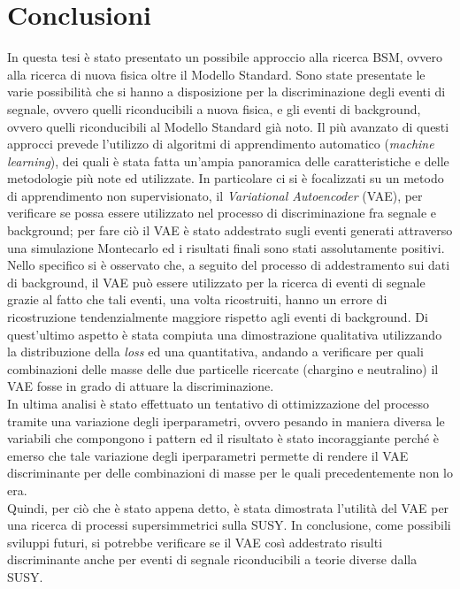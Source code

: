 
\section{Conclusioni}
\label{sec:conclusioni}

In questa tesi è stato presentato un possibile approccio alla ricerca BSM, ovvero alla ricerca di nuova fisica oltre il Modello Standard. Sono state presentate le varie possibilità che si hanno a disposizione per la discriminazione degli eventi di segnale, ovvero quelli riconducibili a nuova fisica, e gli eventi di background, ovvero quelli riconducibili al Modello Standard già noto. Il più avanzato di questi approcci prevede l'utilizzo di algoritmi di apprendimento automatico (\textit{machine learning}), dei quali è stata fatta un'ampia panoramica delle caratteristiche e delle metodologie più note ed utilizzate. In particolare ci si è focalizzati su un metodo di apprendimento non supervisionato, il \textit{Variational Autoencoder} (VAE), per verificare se possa essere utilizzato nel processo di discriminazione fra segnale e background; per fare ciò il VAE è stato addestrato sugli eventi generati attraverso una simulazione Montecarlo ed i risultati finali sono stati assolutamente positivi. Nello specifico si è osservato che, a seguito del processo di addestramento sui dati di background, il VAE può essere utilizzato per la ricerca di eventi di segnale grazie al fatto che tali eventi, una volta ricostruiti, hanno un errore di ricostruzione tendenzialmente maggiore rispetto agli eventi di background. Di quest'ultimo aspetto è stata compiuta una dimostrazione qualitativa utilizzando la distribuzione della \textit{loss} ed una quantitativa, andando a verificare per quali combinazioni delle masse delle due particelle ricercate (chargino e neutralino) il VAE fosse in grado di attuare la discriminazione.\\
In ultima analisi è stato effettuato un tentativo di ottimizzazione del processo tramite una variazione degli iperparametri, ovvero pesando in maniera diversa le variabili che compongono i pattern ed il risultato è stato incoraggiante perché è emerso che tale variazione degli iperparametri permette di rendere il VAE discriminante per delle combinazioni di masse per le quali precedentemente non lo era.\\
Quindi, per ciò che è stato appena detto, è stata dimostrata l'utilità del VAE per una ricerca di processi supersimmetrici sulla SUSY. In conclusione, come possibili sviluppi futuri, si potrebbe verificare se il VAE così addestrato risulti discriminante anche per eventi di segnale riconducibili a teorie diverse dalla SUSY.